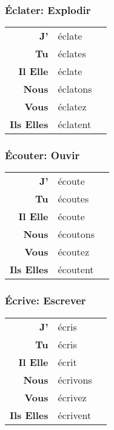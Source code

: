 \documentclass{subfiles}
\begin{document}
\begin{multicols*}{3}
        \subsubsection{Éclater: Explodir}
            \begin{tabular}{r l r}
                \textbf{J'}        & éclate   &\\
                \textbf{Tu}        & éclates  &\\
                \textbf{Il Elle}   & éclate   &\\
                \textbf{Nous}      & éclatons &\\
                \textbf{Vous}      & éclatez  &\\
                \textbf{Ils Elles} & éclatent &
            \end{tabular}

        \subsubsection{Écouter: Ouvir}
            \begin{tabular}{r l r}
                \textbf{J'}        & écoute   &\\
                \textbf{Tu}        & écoutes  &\\
                \textbf{Il Elle}   & écoute   &\\
                \textbf{Nous}      & écoutons &\\
                \textbf{Vous}      & écoutez  &\\
                \textbf{Ils Elles} & écoutent &
            \end{tabular}

        \subsubsection{Écrive: Escrever}
            \begin{tabular}{r l r}
                \textbf{J'}        & écris    &\\
                \textbf{Tu}        & écris    &\\
                \textbf{Il Elle}   & écrit    &\\
                \textbf{Nous}      & écrivons &\\
                \textbf{Vous}      & écrivez  &\\
                \textbf{Ils Elles} & écrivent &
            \end{tabular}


\end{multicols*}
\end{document}
